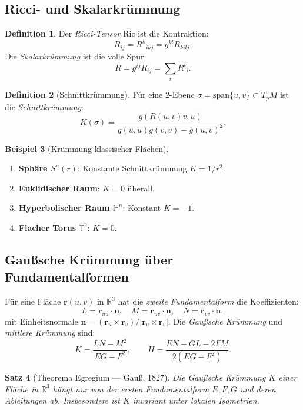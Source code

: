 \documentclass[12pt,a4paper]{amsart}
\newtheorem{theorem}{Satz}[section]
\theoremstyle{definition}
\newtheorem{definition}[theorem]{Definition}
\newtheorem{beispiel}[theorem]{Beispiel}
\begin{document}
\subsection{Ricci- und Skalarkrümmung}

\begin{definition}
Der \emph{Ricci-Tensor} $\mathrm{Ric}$ ist die Kontraktion:
\[
  R_{ij} = R^k{}_{\!ikj} = g^{kl}R_{kilj}.
\]
Die \emph{Skalarkrümmung} ist die volle Spur:
\[
  R = g^{ij}R_{ij} = \sum_i R^i{}_i.
\]
\end{definition}

\begin{definition}[Schnittkrümmung]
Für eine 2-Ebene $\sigma = \mathrm{span}\{u, v\} \subset T_pM$ ist die
\emph{Schnittkrümmung}:
\[
  K(\sigma) = \frac{g(R(u,v)v, u)}{g(u,u)g(v,v) - g(u,v)^2}.
\]
\end{definition}

\begin{beispiel}[Krümmung klassischer Flächen]
\begin{enumerate}[label=(\alph*)]
  \item \textbf{Sphäre $S^n(r)$}: Konstante Schnittkrümmung $K = 1/r^2$.
  \item \textbf{Euklidischer Raum}: $K = 0$ überall.
  \item \textbf{Hyperbolischer Raum $\mathbb{H}^n$}: Konstant $K = -1$.
  \item \textbf{Flacher Torus $\mathbb{T}^2$}: $K = 0$.
\end{enumerate}
\end{beispiel}

\subsection{Gaußsche Krümmung über Fundamentalformen}

Für eine Fläche $\mathbf{r}(u,v)$ in $\mathbb{R}^3$ hat die \emph{zweite
Fundamentalform} die Koeffizienten:
\[
  L = \mathbf{r}_{uu} \cdot \mathbf{n}, \quad
  M = \mathbf{r}_{uv} \cdot \mathbf{n}, \quad
  N = \mathbf{r}_{vv} \cdot \mathbf{n},
\]
mit Einheitsnormale $\mathbf{n} = (\mathbf{r}_u \times \mathbf{r}_v)/|\mathbf{r}_u \times \mathbf{r}_v|$.
Die \emph{Gaußsche Krümmung} und \emph{mittlere Krümmung} sind:
\[
  K = \frac{LN - M^2}{EG - F^2}, \qquad
  H = \frac{EN + GL - 2FM}{2(EG - F^2)}.
\]

\begin{theorem}[Theorema Egregium --- Gauß, 1827]
Die Gaußsche Krümmung $K$ einer Fläche in $\mathbb{R}^3$ hängt nur von der
ersten Fundamentalform $E, F, G$ und deren Ableitungen ab. Insbesondere
ist $K$ invariant unter lokalen Isometrien.
\end{theorem}
\end{document}
